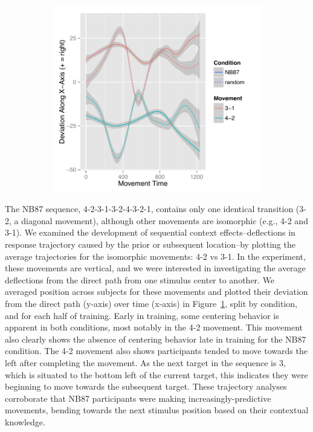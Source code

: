 \documentclass[man,floatsintext]{apa6}
\begin{document}
\begin{figure}[t]
\begin{subfigure}[t]{0.54\textwidth}
                \includegraphics[width=\textwidth]{figures/context4-2vs3-1_late}
        \end{subfigure}
        \label{fig:Traj_4231}
\end{figure}

\addtocounter{figure}{-1}

The NB87 sequence, 4-2-3-1-3-2-4-3-2-1, contains only one identical transition (3-2, a diagonal movement), although other movements are isomorphic (e.g., 4-2 and 3-1). We examined the development of sequential context effects--deflections in response trajectory caused by the prior or subsequent location--by plotting the average trajectories for the isomorphic movements: 4-2 vs 3-1. In the experiment, these movements are vertical, and we were interested in investigating the average deflections from the direct path from one stimulus center to another. We averaged position across subjects for these movements and plotted their deviation from the direct path (y-axis) over time (x-axis) in Figure~\ref{fig:Traj_4231}, split by condition, and for each half of training. Early in training, some centering behavior is apparent in both conditions, most notably in the 4-2 movement. This movement also clearly shows the absence of centering behavior late in training for the NB87 condition. The 4-2 movement also shows participants tended to move towards the left after completing the movement. As the next target in the sequence is 3, which is situated to the bottom left of the current target, this indicates they were beginning to move towards the subsequent target. These trajectory analyses corroborate that NB87 participants were making increasingly-predictive movements, bending towards the next stimulus position based on their contextual knowledge.
\end{document}
